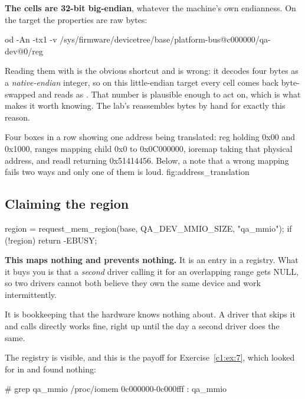 \textbf{The cells are 32-bit big-endian}, whatever the machine's own endianness. On the target the
properties are raw bytes:

\begin{shell}
od -An -tx1 -v /sys/firmware/devicetree/base/platform-bus@c000000/qa-dev@0/reg
\end{shell}

\noindent Reading them with  is the obvious shortcut and is wrong: it decodes four
bytes as a \emph{native-endian} integer, so on this little-endian target every cell comes back
byte-swapped and  reads as . That number is plausible enough to
act on, which is what makes it worth knowing. The lab's  reassembles bytes by hand for
exactly this reason.

  {Four boxes in a row showing one address being translated: reg holding 0x00 and 0x1000, ranges
   mapping child 0x0 to 0x0C000000, ioremap taking that physical address, and readl returning
   0x51414456. Below, a note that a wrong mapping fails two ways and only one of them is loud.}
  {fig:address_translation}

\subsection{Claiming the region}
\label{c6:app:b2}

\begin{ccode}
region = request_mem_region(base, QA_DEV_MMIO_SIZE, "qa_mmio");
if (!region)
        return -EBUSY;
\end{ccode}

\noindent \textbf{This maps nothing and prevents nothing.} It is an entry in a registry. What it
buys you is that a \emph{second} driver calling it for an overlapping range gets NULL, so two
drivers cannot both believe they own the same device and work intermittently.

It is bookkeeping that the hardware knows nothing about. A driver that skips it and calls
 directly works fine, right up until the day a second driver does the same.

The registry is visible, and this is the payoff for Exercise~\ref{c1:ex:7}, which looked for
 in  and found nothing:

\begin{console}
# grep qa_mmio /proc/iomem
0c000000-0c000fff : qa_mmio
\end{console}

